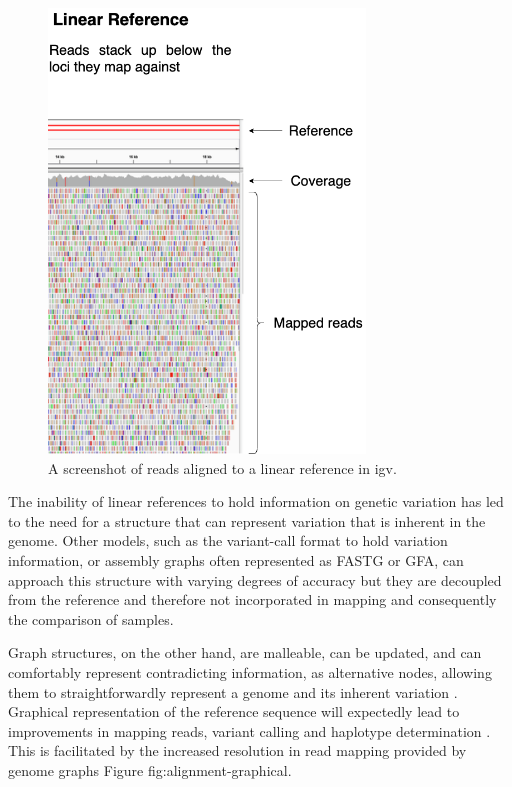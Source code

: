 \documentclass[10pt, a4paper]{article}
\begin{document}
\begin{figure}[htbp]
\centering
\includegraphics[width=0.75\textwidth]{../Figures/Alignment-igv.png}
\caption[Read alignment against a linear reference]{\label{fig:org1e94daa}A screenshot of reads aligned to a linear reference in igv.}
\end{figure}


The inability of linear references to hold information on genetic variation has
led to the need for a structure that can represent variation that is inherent in
the genome.
Other models, such as the variant-call format to hold variation information, or
assembly graphs often represented as FASTG or GFA, can approach this structure
with varying degrees of accuracy but they are decoupled from the reference and
therefore not incorporated in mapping and consequently the comparison of
samples. 

Graph structures, on the other hand, are malleable, can be updated, and can
comfortably represent contradicting information, as alternative nodes, allowing
them to straightforwardly represent a genome and its inherent variation
\cite{patenGenomeGraphsEvolution2017,liDesignConstructionReference2020}.
Graphical representation of the reference sequence will expectedly lead to
improvements in mapping reads, variant calling and haplotype determination
\cite{patenGenomeGraphsEvolution2017}.
This is facilitated by the increased resolution in read mapping provided by
genome graphs Figure fig:alignment-graphical.
\end{document}
